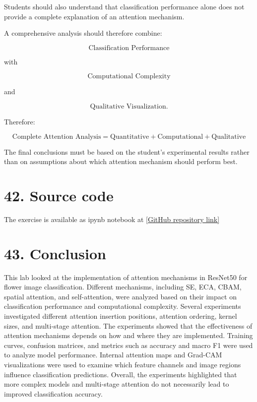 \documentclass[10pt]{article}
\begin{document}
Students should also understand that classification performance alone does
not provide a complete explanation of an attention mechanism.

A comprehensive analysis should therefore combine:

\[
\boxed{
\text{Classification Performance}
}
\]

with

\[
\boxed{
\text{Computational Complexity}
}
\]

and

\[
\boxed{
\text{Qualitative Visualization}.
}
\]

Therefore: 

\[
\boxed{
\text{Complete Attention Analysis}
=
\text{Quantitative}
+
\text{Computational}
+
\text{Qualitative}
}
\]

The final conclusions must be based on the student's experimental results
rather than on assumptions about which attention mechanism should perform
best.

\section*{42. Source code}

The exercise is available as ipynb notebook at \href{https://github.com/your-username/your-repository}{[GitHub repository link]}

\section*{43. Conclusion}

This lab looked at the implementation of attention mechanisms in ResNet50 for flower image classification. Different mechanisms, including SE, ECA, CBAM, spatial attention, and self-attention, were analyzed based on their impact on classification performance and computational complexity. Several experiments investigated different attention insertion positions, attention ordering, kernel sizes, and multi-stage attention. The experiments showed that the effectiveness of attention mechanisms depends on how and where they are implemented. Training curves, confusion matrices, and metrics such as accuracy and macro F1 were used to analyze model performance. Internal attention maps and Grad-CAM visualizations were used to examine which feature channels and image regions influence classification predictions. Overall, the experiments highlighted that more complex models and multi-stage attention do not necessarily lead to improved classification accuracy.
\end{document}
